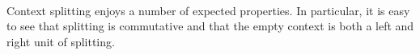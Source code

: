 \begin{code}%
\>[0]\AgdaSpace{}%
\AgdaSymbol{:}\AgdaSpace{}%
\AgdaSpace{}%
\AgdaSpace{}%
\AgdaSpace{}%
\AgdaSpace{}%
\AgdaSpace{}%
\AgdaSpace{}%
\<%
\\
\>[0]\AgdaSpace{}%
\AgdaSpace{}%
\AgdaSpace{}%
\AgdaOperator{\AgdaFunction{,}}\AgdaSpace{}%
\AgdaSpace{}%
\AgdaSymbol{=}\AgdaSpace{}%
\AgdaSpace{}%
\AgdaSpace{}%
\AgdaOperator{\AgdaFunction{[}}\AgdaSpace{}%
\AgdaSpace{}%
\AgdaOperator{\AgdaFunction{]}}\AgdaSpace{}%
\AgdaOperator{\AgdaDatatype{+}}\AgdaSpace{}%
\<%
\end{code}

Context splitting enjoys a number of expected properties. In particular, it is
easy to see that splitting is commutative and that the empty context is both a
left and right unit of splitting.

